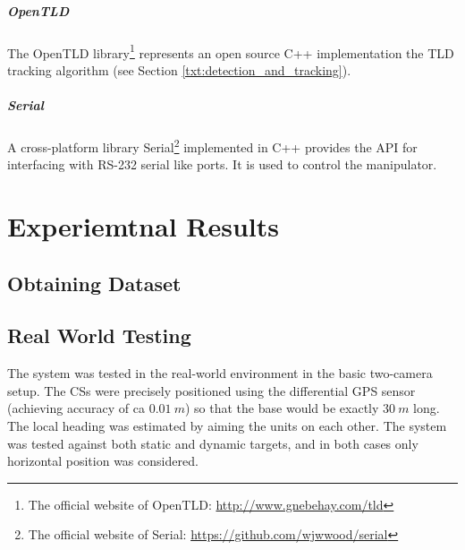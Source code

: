 	\paragraph{OpenTLD} The OpenTLD library\footnote{The official website of OpenTLD: \url{http://www.gnebehay.com/tld}} represents an open source C++ implementation the TLD tracking algorithm (see Section \ref{txt:detection_and_tracking}).	
	
	\paragraph{Serial} A cross-platform library Serial\footnote{The official website of Serial: \url{https://github.com/wjwwood/serial}} implemented in C++ provides the API for interfacing with RS-232 serial like ports. It is used to control the manipulator.
	
\chapter{Experiemtnal Results}

\section{Obtaining Dataset} \label{txt:obtaining_dataset}

\vata[4]
	
\section{Real World Testing} \label{txt:real_world_testing}

The system was tested in the real-world environment in the basic two-camera setup. The CSs were precisely positioned using the differential GPS sensor (achieving accuracy of ca $0.01~m$) so that the base would be exactly $30~m$ long.  The local heading was estimated by aiming the units on each other. The system was tested against both static and dynamic targets, and in both cases only horizontal position was considered. 

